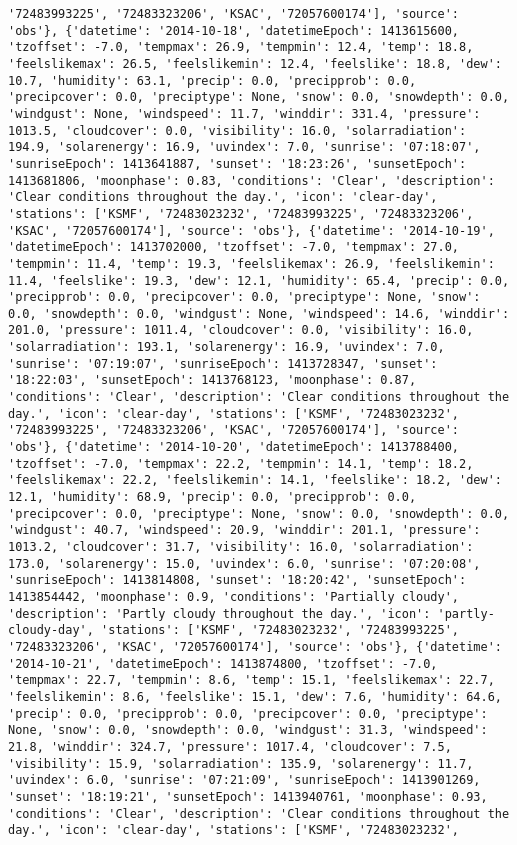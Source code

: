 \documentclass[
  letterpaper,
  DIV=11,
  numbers=noendperiod]{scrartcl}
\begin{document}
\begin{verbatim}
'72483993225', '72483323206', 'KSAC', '72057600174'], 'source': 'obs'}, {'datetime': '2014-10-18', 'datetimeEpoch': 1413615600, 'tzoffset': -7.0, 'tempmax': 26.9, 'tempmin': 12.4, 'temp': 18.8, 'feelslikemax': 26.5, 'feelslikemin': 12.4, 'feelslike': 18.8, 'dew': 10.7, 'humidity': 63.1, 'precip': 0.0, 'precipprob': 0.0, 'precipcover': 0.0, 'preciptype': None, 'snow': 0.0, 'snowdepth': 0.0, 'windgust': None, 'windspeed': 11.7, 'winddir': 331.4, 'pressure': 1013.5, 'cloudcover': 0.0, 'visibility': 16.0, 'solarradiation': 194.9, 'solarenergy': 16.9, 'uvindex': 7.0, 'sunrise': '07:18:07', 'sunriseEpoch': 1413641887, 'sunset': '18:23:26', 'sunsetEpoch': 1413681806, 'moonphase': 0.83, 'conditions': 'Clear', 'description': 'Clear conditions throughout the day.', 'icon': 'clear-day', 'stations': ['KSMF', '72483023232', '72483993225', '72483323206', 'KSAC', '72057600174'], 'source': 'obs'}, {'datetime': '2014-10-19', 'datetimeEpoch': 1413702000, 'tzoffset': -7.0, 'tempmax': 27.0, 'tempmin': 11.4, 'temp': 19.3, 'feelslikemax': 26.9, 'feelslikemin': 11.4, 'feelslike': 19.3, 'dew': 12.1, 'humidity': 65.4, 'precip': 0.0, 'precipprob': 0.0, 'precipcover': 0.0, 'preciptype': None, 'snow': 0.0, 'snowdepth': 0.0, 'windgust': None, 'windspeed': 14.6, 'winddir': 201.0, 'pressure': 1011.4, 'cloudcover': 0.0, 'visibility': 16.0, 'solarradiation': 193.1, 'solarenergy': 16.9, 'uvindex': 7.0, 'sunrise': '07:19:07', 'sunriseEpoch': 1413728347, 'sunset': '18:22:03', 'sunsetEpoch': 1413768123, 'moonphase': 0.87, 'conditions': 'Clear', 'description': 'Clear conditions throughout the day.', 'icon': 'clear-day', 'stations': ['KSMF', '72483023232', '72483993225', '72483323206', 'KSAC', '72057600174'], 'source': 'obs'}, {'datetime': '2014-10-20', 'datetimeEpoch': 1413788400, 'tzoffset': -7.0, 'tempmax': 22.2, 'tempmin': 14.1, 'temp': 18.2, 'feelslikemax': 22.2, 'feelslikemin': 14.1, 'feelslike': 18.2, 'dew': 12.1, 'humidity': 68.9, 'precip': 0.0, 'precipprob': 0.0, 'precipcover': 0.0, 'preciptype': None, 'snow': 0.0, 'snowdepth': 0.0, 'windgust': 40.7, 'windspeed': 20.9, 'winddir': 201.1, 'pressure': 1013.2, 'cloudcover': 31.7, 'visibility': 16.0, 'solarradiation': 173.0, 'solarenergy': 15.0, 'uvindex': 6.0, 'sunrise': '07:20:08', 'sunriseEpoch': 1413814808, 'sunset': '18:20:42', 'sunsetEpoch': 1413854442, 'moonphase': 0.9, 'conditions': 'Partially cloudy', 'description': 'Partly cloudy throughout the day.', 'icon': 'partly-cloudy-day', 'stations': ['KSMF', '72483023232', '72483993225', '72483323206', 'KSAC', '72057600174'], 'source': 'obs'}, {'datetime': '2014-10-21', 'datetimeEpoch': 1413874800, 'tzoffset': -7.0, 'tempmax': 22.7, 'tempmin': 8.6, 'temp': 15.1, 'feelslikemax': 22.7, 'feelslikemin': 8.6, 'feelslike': 15.1, 'dew': 7.6, 'humidity': 64.6, 'precip': 0.0, 'precipprob': 0.0, 'precipcover': 0.0, 'preciptype': None, 'snow': 0.0, 'snowdepth': 0.0, 'windgust': 31.3, 'windspeed': 21.8, 'winddir': 324.7, 'pressure': 1017.4, 'cloudcover': 7.5, 'visibility': 15.9, 'solarradiation': 135.9, 'solarenergy': 11.7, 'uvindex': 6.0, 'sunrise': '07:21:09', 'sunriseEpoch': 1413901269, 'sunset': '18:19:21', 'sunsetEpoch': 1413940761, 'moonphase': 0.93, 'conditions': 'Clear', 'description': 'Clear conditions throughout the day.', 'icon': 'clear-day', 'stations': ['KSMF', '72483023232', 
\end{verbatim}
\end{document}

